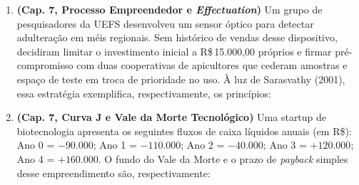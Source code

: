 \begin{enumerate}[leftmargin=1.5em, itemsep=8pt]
  \item \textbf{(Cap. 7, Processo Empreendedor e \textit{Effectuation})} Um grupo de pesquisadores da UEFS desenvolveu um sensor óptico para detectar adulteração em méis regionais. Sem histórico de vendas desse dispositivo, decidiram limitar o investimento inicial a R\$\,15.000,00 próprios e firmar pré-compromisso com duas cooperativas de apicultores que cederam amostras e espaço de teste em troca de prioridade no uso. À luz de Sarasvathy (2001), essa estratégia exemplifica, respectivamente, os princípios:
  \espacoResolucao[1.2cm]

  \item \textbf{(Cap. 7, Curva J e Vale da Morte Tecnológico)} Uma startup de biotecnologia apresenta os seguintes fluxos de caixa líquidos anuais (em R\$): Ano 0 = $-90.000$; Ano 1 = $-110.000$; Ano 2 = $-40.000$; Ano 3 = $+120.000$; Ano 4 = $+160.000$. O fundo do Vale da Morte e o prazo de \textit{payback} simples desse empreendimento são, respectivamente:
  \espacoResolucao[1.5cm]


\end{enumerate}
